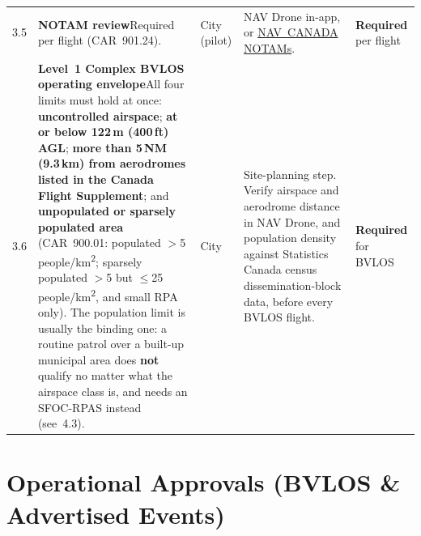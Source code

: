 \documentclass[11pt,letterpaper]{article}
\newcommand{\itemrule}{\arrayrulecolor{uavrule}\midrule\arrayrulecolor{black}}
\newcommand{\reqcell}[2]{\textbf{#1}\newline\small\color{uavgrey}#2}
\newcommand{\req}{\textbf{\color{uavwarn!85!black}Required}}
\begin{document}
\begin{longtable}{@{}L{0.28in} L{2.20in} L{0.85in} L{1.95in} L{0.85in}@{}}
3.5 &
\reqcell{NOTAM review}{Required per flight (CAR~901.24).} &
City (pilot) &
NAV Drone in-app, or \href{https://plan.navcanada.ca/wxrecall/}{NAV~CANADA NOTAMs}. &
\req{} per flight \\ \itemrule

3.6 &
\reqcell{Level~1 Complex BVLOS operating envelope}{All four limits must hold at once: \textbf{uncontrolled airspace}; \textbf{at or below 122\,m (400\,ft) AGL}; \textbf{more than 5\,NM (9.3\,km) from aerodromes listed in the Canada Flight Supplement}; and \textbf{unpopulated or sparsely populated area} (CAR~900.01: populated $>$5 people/km\textsuperscript{2}; sparsely populated $>$5 but $\leq$25 people/km\textsuperscript{2}, and small RPA only). The population limit is usually the binding one: a routine patrol over a built-up municipal area does \textbf{not} qualify no matter what the airspace class is, and needs an SFOC-RPAS instead (see~4.3).} &
City &
Site-planning step. Verify airspace and aerodrome distance in NAV Drone, and population density against Statistics Canada census dissemination-block data, before every BVLOS flight. &
\req{} for BVLOS \\

\end{longtable}

\newpage

\section{Operational Approvals (BVLOS \& Advertised Events)}
\end{document}
